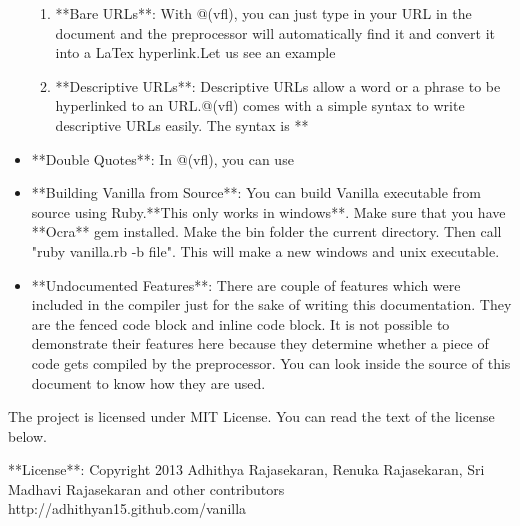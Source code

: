 \documentclass{article}
\begin{document}
\begin{itemize}
\begin{enumerate}

\item **Bare URLs**: With @(vfl), you can just type in your URL in the document and the preprocessor will automatically find it and convert it into a LaTex hyperlink.Let us see an example


\item **Descriptive URLs**: Descriptive URLs allow a word or a phrase to be hyperlinked to an URL.@(vfl) comes with a simple syntax to write descriptive URLs easily. The syntax is **%


\end{enumerate}

\item **Double Quotes**: In @(vfl), you can use %

\item **Building Vanilla from Source**: You can build Vanilla executable from source using Ruby.**This only works in windows**. Make sure that you have **Ocra** gem installed. Make the bin folder the current directory. Then call "ruby vanilla.rb -b file". This will make a new windows and unix executable.   

\item **Undocumented Features**: There are couple of features which were included in the compiler just for the sake of writing this documentation. They are the fenced code block and inline code block. It is not possible to demonstrate their features here because they determine whether a piece of code gets compiled by the preprocessor. You can look inside the source of this document to know how they are used. 

\end{itemize}

The project is licensed under MIT License. You can read the text of the license below.

\vspace{5pt} 

**License**: Copyright 2013 Adhithya Rajasekaran, Renuka Rajasekaran, Sri Madhavi Rajasekaran and other contributors
http://adhithyan15.github.com/vanilla
\end{document}
